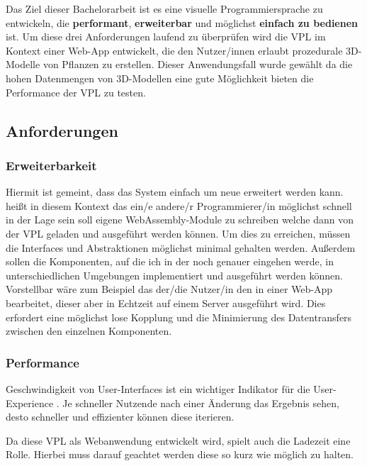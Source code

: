 \documentclass[ngerman]{article}
\begin{document}
Das Ziel dieser Bachelorarbeit ist es eine visuelle Programmiersprache zu entwickeln, die \textbf{performant}, \textbf{erweiterbar} und möglichst \textbf{einfach zu bedienen} ist.
Um diese drei Anforderungen laufend zu überprüfen wird die VPL im Kontext einer Web-App entwickelt, die den Nutzer/innen erlaubt prozedurale 3D-Modelle von Pflanzen zu erstellen.
Dieser Anwendungsfall wurde gewählt da die hohen Datenmengen von 3D-Modellen eine gute Möglichkeit bieten die Performance der VPL zu testen.

\subsection{Anforderungen}

\subsubsection{Erweiterbarkeit}

Hiermit ist gemeint, dass das System einfach um neue  erweitert werden kann.
 heißt in diesem Kontext das ein/e andere/r Programmierer/in möglichst 
schnell in der Lage sein soll eigene WebAssembly-Module zu schreiben welche dann von der VPL geladen und ausgeführt werden können.
Um dies zu erreichen, müssen die Interfaces und Abstraktionen möglichst minimal gehalten werden.
\br
Außerdem sollen die Komponenten, auf die ich in der  noch genauer eingehen werde, in unterschiedlichen Umgebungen implementiert und ausgeführt werden können.
Vorstellbar wäre zum Beispiel das der/die Nutzer/in den  in einer Web-App bearbeitet, dieser aber in Echtzeit auf einem Server ausgeführt wird. 
Dies erfordert eine möglichst lose Kopplung und die Minimierung des Datentransfers zwischen den einzelnen Komponenten.

\subsubsection{Performance}

Geschwindigkeit von User-Interfaces ist ein wichtiger Indikator für die User-Experience \cite{6876022}. 
Je schneller Nutzende nach einer Änderung das Ergebnis sehen, desto schneller und effizienter können diese iterieren. 

Da diese VPL als Webanwendung entwickelt wird, spielt auch die Ladezeit eine Rolle. 
Hierbei muss darauf geachtet werden diese so kurz wie möglich zu halten.
\end{document}
